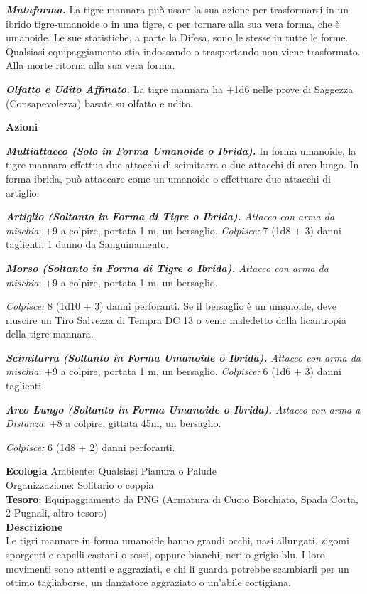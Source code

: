 \begin{multicols}{2}
\textit{\textbf{Mutaforma.}} La tigre mannara può usare la sua azione per trasformarsi in un ibrido tigre-umanoide o in una tigre, o per tornare alla sua vera forma, che è umanoide. Le sue statistiche, a parte la Difesa, sono le stesse in tutte le forme. Qualsiasi equipaggiamento stia indossando o trasportando non viene trasformato. Alla morte ritorna alla sua vera forma.

\textit{\textbf{Olfatto e Udito Affinato.}} La tigre mannara ha +1d6 nelle prove di Saggezza (Consapevolezza) basate su olfatto e udito.

\textbf{Azioni}

\textit{\textbf{Multiattacco (Solo in Forma Umanoide o Ibrida).}} In forma umanoide, la tigre mannara effettua due attacchi di scimitarra o due attacchi di arco lungo. In forma ibrida, può attaccare come un umanoide o effettuare due attacchi di artiglio.

\textit{\textbf{Artiglio (Soltanto in Forma di Tigre o Ibrida).} Attacco con arma da mischia}: +9 a colpire, portata 1 m, un bersaglio. \textit{Colpisce:} 7 (1d8 + 3) danni taglienti, 1 danno da Sanguinamento.

\textit{\textbf{Morso (Soltanto in Forma di Tigre o Ibrida).} Attacco con arma da mischia}: +9 a colpire, portata 1 m, un bersaglio.

\textit{Colpisce:} 8 (1d10 + 3) danni perforanti. Se il bersaglio è un umanoide, deve riuscire un Tiro Salvezza di Tempra DC 13 o venir maledetto dalla licantropia della tigre mannara.

\textit{\textbf{Scimitarra (Soltanto in Forma Umanoide o Ibrida).} Attacco con arma da mischia}: +9 a colpire, portata 1 m, un bersaglio. \textit{Colpisce:} 6 (1d6 + 3) danni taglienti.

\textit{\textbf{Arco Lungo (Soltanto in Forma Umanoide o Ibrida).} Attacco con arma a Distanza}: +8 a colpire, gittata 45m, un bersaglio.

\textit{Colpisce:} 6 (1d8 + 2) danni perforanti.

\textbf{Ecologia}
Ambiente: Qualsiasi Pianura o Palude\\
Organizzazione: Solitario o coppia\\
\textbf{Tesoro}: Equipaggiamento da PNG (Armatura di Cuoio Borchiato, Spada Corta, 2 Pugnali, altro tesoro)\\
\textbf{Descrizione}\\
Le tigri mannare in forma umanoide hanno grandi occhi, nasi allungati, zigomi sporgenti e capelli castani o rossi, oppure bianchi, neri o grigio-blu. I loro movimenti sono attenti e aggraziati, e chi li guarda potrebbe scambiarli per un ottimo tagliaborse, un danzatore aggraziato o un'abile cortigiana.



\end{multicols}
